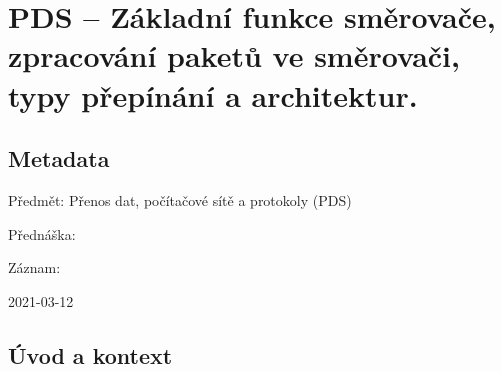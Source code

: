 

\graphicspath{{pds/smerovace/figures}}


\chapter{PDS -- Základní funkce směrovače, zpracování paketů ve směrovači, typy přepínání a architektur.}


\section{Metadata}

\begin{compactitem}
    \item Předmět: Přenos dat, počítačové sítě a protokoly (PDS)
    \item Přednáška:
    \begin{compactitem}
        \item {}
    \end{compactitem}
    \item Záznam:
    \begin{compactitem}
        \item 2021-03-12
    \end{compactitem}
\end{compactitem}


\section{Úvod a kontext}

